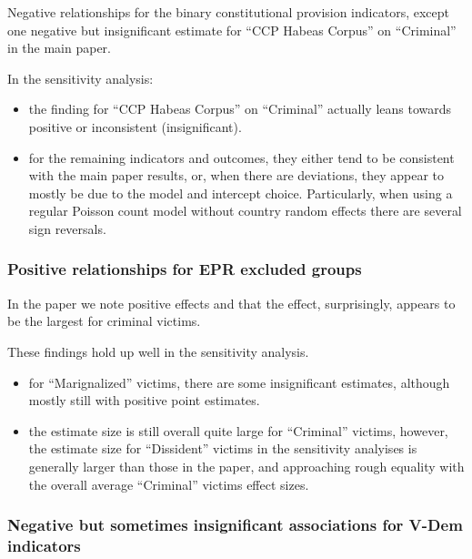 \documentclass[]{article}
\providecommand{\tightlist}{%
  \setlength{\itemsep}{0pt}\setlength{\parskip}{0pt}}
\begin{document}
Negative relationships for the binary constitutional provision
indicators, except one negative but insignificant estimate for ``CCP
Habeas Corpus'' on ``Criminal'' in the main paper.

In the sensitivity analysis:

\begin{itemize}
\tightlist
\item
  the finding for ``CCP Habeas Corpus'' on ``Criminal'' actually leans
  towards positive or inconsistent (insignificant).
\item
  for the remaining indicators and outcomes, they either tend to be
  consistent with the main paper results, or, when there are deviations,
  they appear to mostly be due to the model and intercept choice.
  Particularly, when using a regular Poisson count model without country
  random effects there are several sign reversals.
\end{itemize}

\hypertarget{positive-relationships-for-epr-excluded-groups}{%
\subsubsection{Positive relationships for EPR excluded
groups}\label{positive-relationships-for-epr-excluded-groups}}

In the paper we note positive effects and that the effect, surprisingly,
appears to be the largest for criminal victims.

These findings hold up well in the sensitivity analysis.

\begin{itemize}
\tightlist
\item
  for ``Marignalized'' victims, there are some insignificant estimates,
  although mostly still with positive point estimates.
\item
  the estimate size is still overall quite large for ``Criminal''
  victims, however, the estimate size for ``Dissident'' victims in the
  sensitivity analyises is generally larger than those in the paper, and
  approaching rough equality with the overall average ``Criminal''
  victims effect sizes.
\end{itemize}

\hypertarget{negative-but-sometimes-insignificant-associations-for-v-dem-indicators}{%
\subsubsection{Negative but sometimes insignificant associations for
V-Dem
indicators}\label{negative-but-sometimes-insignificant-associations-for-v-dem-indicators}}
\end{document}

